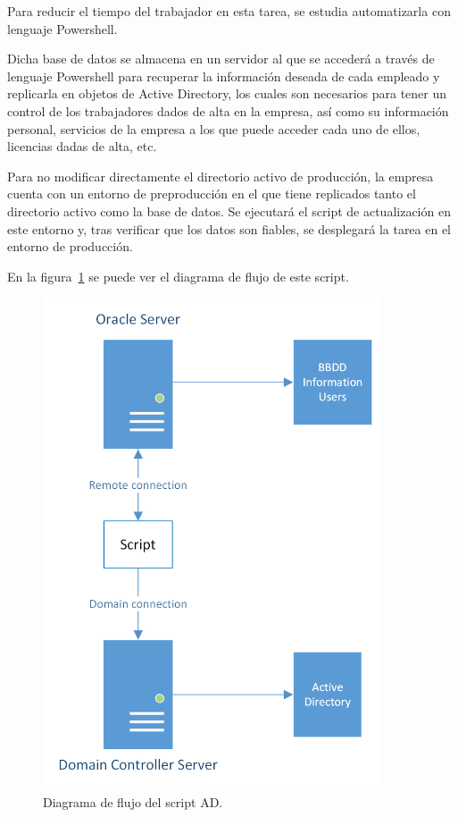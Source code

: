 \documentclass[a4paper, 12pt]{book}
\begin{document}
Para reducir el tiempo del trabajador en esta tarea, se estudia automatizarla con lenguaje Powershell.

Dicha base de datos se almacena en un servidor al que se accederá a través de lenguaje Powershell para recuperar la información deseada de cada empleado y replicarla en objetos de Active Directory, los cuales son necesarios para tener un control de los trabajadores dados de alta en la empresa, así como su información personal, servicios de la empresa a los que puede acceder cada uno de ellos, licencias dadas de alta, etc.

Para no modificar directamente el directorio activo de producción, la empresa cuenta con un entorno de preproducción en el que tiene replicados tanto el directorio activo como la base de datos. Se ejecutará el script de actualización en este entorno y, tras verificar que los datos son fiables, se desplegará la tarea en el entorno de producción.

En la figura~\ref{fig:UpdateUsers_diagrama} se puede ver el diagrama de flujo de este script.

\begin{figure}[H]
	\centering
	\includegraphics[width=10cm, keepaspectratio]{img/UpdateUsers_diagrama.png}
	\caption{Diagrama de flujo del script AD.}
	\label{fig:UpdateUsers_diagrama}
\end{figure}
\end{document}
